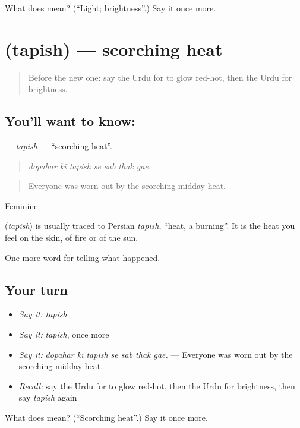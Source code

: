 \begin{tcolorbox}[breakable,colback=teal!4,colframe=teal!35!black,title={Before you move on}]
What does  mean? (\textquotedblleft{}Light; brightness\textquotedblright{}.) Say it once more.
\end{tcolorbox}
\section[\texorpdfstring{\ur{تپش} (tapish)}{تپش (tapish)}]{ (tapish) — scorching heat}

\label{lesson:UR-C288-tapish}



\begin{quote}
Before the new one: say the Urdu for to glow red-hot, then the Urdu for brightness.
\end{quote}

\subsection*{You'll want to know: }
\textbf{} — \emph{tapish} — \textquotedblleft{}scorching heat\textquotedblright{}.

\begin{quote}
      
\end{quote}

\begin{quote}
\emph{dopahar kī tapish se sab thak gae.}
\end{quote}

\begin{quote}
Everyone was worn out by the scorching midday heat.
\end{quote}

Feminine.

\begin{cousinweb}
\textbf{} (\emph{tapish}) is usually traced to Persian \emph{tapish}, \textquotedblleft{}heat, a burning\textquotedblright{}. It is the heat you feel on the skin, of fire or of the sun.
\end{cousinweb}

\begin{grammarlens}[title={What you've built}]
One more word for telling what happened.
\end{grammarlens}

\subsection*{Your turn}
\begin{itemize}
\raggedright
  \item \emph{Say it:} \emph{tapish}
  \item \emph{Say it:} \emph{tapish}, once more
  \item \emph{Say it:} \emph{dopahar kī tapish se sab thak gae.} — Everyone was worn out by the scorching midday heat.
  \item \emph{Recall:} say the Urdu for to glow red-hot, then the Urdu for brightness, then say \emph{tapish} again
\end{itemize}

\begin{tcolorbox}[breakable,colback=teal!4,colframe=teal!35!black,title={Before you move on}]
What does  mean? (\textquotedblleft{}Scorching heat\textquotedblright{}.) Say it once more.
\end{tcolorbox}

